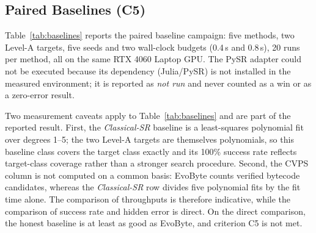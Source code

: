 \documentclass[11pt,a4paper]{article}
\begin{document}
\subsection{Paired Baselines (C5)}
\label{sec:baselines}
Table~\ref{tab:baselines} reports the paired baseline campaign: five methods, two Level-A
targets, five seeds and two wall-clock budgets (0.4\,s and 0.8\,s), 20 runs per method, all on
the same RTX 4060 Laptop GPU. The PySR adapter could not be executed because its dependency
(Julia/PySR) is not installed in the measured environment; it is reported as \emph{not run} and
never counted as a win or as a zero-error result.

\begin{table}[t]
\centering
\caption{Measured paired baseline campaign (P155). 20 runs per method on two Level-A targets,
five seeds, budgets 0.4\,s and 0.8\,s. The PySR adapter was not executed.}
\label{tab:baselines}
\end{table}

Two measurement caveats apply to Table~\ref{tab:baselines} and are part of the reported result.
First, the \emph{Classical-SR} baseline is a least-squares polynomial fit over degrees 1--5;
the two Level-A targets are themselves polynomials, so this baseline class covers the target
class exactly and its 100\% success rate reflects target-class coverage rather than a stronger
search procedure. Second, the CVPS column is not computed on a common basis: EvoByte counts
verified bytecode candidates, whereas the \emph{Classical-SR} row divides five polynomial fits
by the fit time alone. The comparison of throughputs is therefore indicative, while the
comparison of success rate and hidden error is direct. On the direct comparison, the honest
baseline is at least as good as EvoByte, and criterion C5 is not met.
\end{document}
